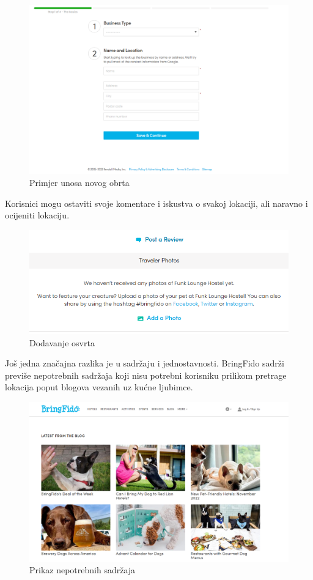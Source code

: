 \begin{figure}[H]
	\includegraphics[scale=0.4]{slike/BringFidoBusiness.png} 
	\centering
	\caption{Primjer unosa novog obrta}
	\label{fig:promjene}
\end{figure}
Korisnici mogu ostaviti svoje komentare i iskustva o svakoj lokaciji, ali naravno i ocijeniti lokaciju. 
\begin{figure}[H]
	\includegraphics[scale=0.4]{slike/BringFidoAddReview.png}
	\centering
	\caption{Dodavanje osvrta}
	\label{fig:promjene}
\end{figure}
Još jedna značajna razlika je u sadržaju i jednostavnosti. BringFido sadrži previše nepotrebnih sadržaja koji nisu potrebni korisniku prilikom pretrage lokacija poput blogova vezanih uz kućne ljubimce.
\begin{figure}[H]
	\includegraphics[scale=0.4]{slike/Nepotrebno.png}
	\centering
	\caption{Prikaz nepotrebnih sadržaja}
	\label{fig:promjene}
\end{figure}

\eject
		
	